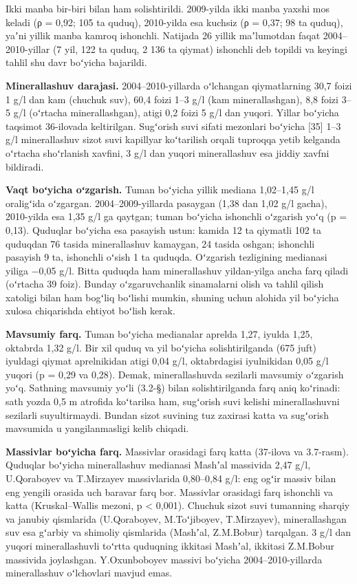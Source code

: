 \documentclass[14pt,a4paper,oneside]{extreport}
\begin{document}
Ikki manba bir-biri bilan ham solishtirildi. 2009-yilda ikki manba
yaxshi mos keladi (ρ = 0,92; 105 ta quduq), 2010-yilda esa kuchsiz (ρ =
0,37; 98 ta quduq), yaʼni yillik manba kamroq ishonchli. Natijada 26
yillik maʼlumotdan faqat 2004--2010-yillar (7 yil, 122 ta quduq, 2 136
ta qiymat) ishonchli deb topildi va keyingi tahlil shu davr boʻyicha
bajarildi.

\textbf{Minerallashuv darajasi.} 2004--2010-yillarda oʻlchangan
qiymatlarning 30,7 foizi 1 g/l dan kam (chuchuk suv), 60,4 foizi 1--3
g/l (kam minerallashgan), 8,8 foizi 3--5 g/l (oʻrtacha minerallashgan),
atigi 0,2 foizi 5 g/l dan yuqori. Yillar boʻyicha taqsimot 36-ilovada
keltirilgan. Sugʻorish suvi sifati mezonlari boʻyicha {[}35{]} 1--3 g/l
minerallashuv sizot suvi kapillyar koʻtarilish orqali tuproqqa yetib
kelganda oʻrtacha shoʻrlanish xavfini, 3 g/l dan yuqori minerallashuv
esa jiddiy xavfni bildiradi.

\textbf{Vaqt boʻyicha oʻzgarish.} Tuman boʻyicha yillik mediana
1,02--1,45 g/l oraligʻida oʻzgargan. 2004--2009-yillarda pasaygan (1,38
dan 1,02 g/l gacha), 2010-yilda esa 1,35 g/l ga qaytgan; tuman boʻyicha
ishonchli oʻzgarish yoʻq (p = 0,13). Quduqlar boʻyicha esa pasayish
ustun: kamida 12 ta qiymatli 102 ta quduqdan 76 tasida minerallashuv
kamaygan, 24 tasida oshgan; ishonchli pasayish 9 ta, ishonchli oʻsish 1
ta quduqda. Oʻzgarish tezligining medianasi yiliga −0,05 g/l. Bitta
quduqda ham minerallashuv yildan-yilga ancha farq qiladi (oʻrtacha 39
foiz). Bunday oʻzgaruvchanlik sinamalarni olish va tahlil qilish
xatoligi bilan ham bogʻliq boʻlishi mumkin, shuning uchun alohida yil
boʻyicha xulosa chiqarishda ehtiyot boʻlish kerak.

\textbf{Mavsumiy farq.} Tuman boʻyicha medianalar aprelda 1,27, iyulda
1,25, oktabrda 1,32 g/l. Bir xil quduq va yil boʻyicha solishtirilganda
(675 juft) iyuldagi qiymat aprelnikidan atigi 0,04 g/l, oktabrdagisi
iyulnikidan 0,05 g/l yuqori (p = 0,29 va 0,28). Demak, minerallashuvda
sezilarli mavsumiy oʻzgarish yoʻq. Sathning mavsumiy yoʻli (3.2-§) bilan
solishtirilganda farq aniq koʻrinadi: sath yozda 0,5 m atrofida
koʻtarilsa ham, sugʻorish suvi kelishi minerallashuvni sezilarli
suyultirmaydi. Bundan sizot suvining tuz zaxirasi katta va sugʻorish
mavsumida u yangilanmasligi kelib chiqadi.

\textbf{Massivlar boʻyicha farq.} Massivlar orasidagi farq katta
(37-ilova va 3.7-rasm). Quduqlar boʻyicha minerallashuv medianasi
Mashʼal massivida 2,47 g/l, U.Qoraboyev va T.Mirzayev massivlarida
0,80--0,84 g/l: eng ogʻir massiv bilan eng yengili orasida uch baravar
farq bor. Massivlar orasidagi farq ishonchli va katta (Kruskal--Wallis
mezoni, p \textless{} 0,001). Chuchuk sizot suvi tumanning sharqiy va
janubiy qismlarida (U.Qoraboyev, M.Toʻjiboyev, T.Mirzayev),
minerallashgan suv esa gʻarbiy va shimoliy qismlarida (Mashʼal,
Z.M.Bobur) tarqalgan. 3 g/l dan yuqori minerallashuvli toʻrtta quduqning
ikkitasi Mashʼal, ikkitasi Z.M.Bobur massivida joylashgan. Y.Oxunboboyev
massivi boʻyicha 2004--2010-yillarda minerallashuv oʻlchovlari mavjud
emas.
\end{document}
